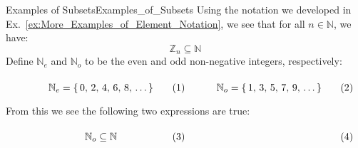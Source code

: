         \begin{lexample}{Examples of Subsets}{Examples_of_Subsets}
            Using the notation we developed in
            Ex.~\ref{ex:More_Examples_of_Element_Notation}, we see that
            for all $n\in\mathbb{N}$, we have:
            \begin{equation}
                \mathbb{Z}_{n}\subseteq\mathbb{N}
            \end{equation}
            Define $\mathbb{N}_{e}$ and $\mathbb{N}_{o}$ to be the even
            and odd non-negative integers, respectively:
            \par
            \begin{subequations}
                \begin{minipage}[b]{0.49\textwidth}
                    \begin{equation}
                        \label{eqn:Even_Pos_Ints_Ellipses}%
                        \mathbb{N}_{e}=\{\,0,\,2,\,4,\,6,\,8,\,\dots\,\}
                    \end{equation}
                \end{minipage}
                \hfill
                \begin{minipage}[b]{0.49\textwidth}
                    \begin{equation}
                        \label{eqn:Odd_Pos_Ints_Ellipses}%
                        \mathbb{N}_{o}=\{\,1,\,3,\,5,\,7,\,9,\,\dots\,\}
                    \end{equation}
                \end{minipage}
            \end{subequations}
            \par\vspace{2.5ex}
            From this we see the following two expressions are true:
            \par\hfill\par
            \begin{subequations}
                \begin{minipage}[b]{0.49\textwidth}
                    \begin{equation}
                        \mathbb{N}_{o}\subseteq\mathbb{N}
                    \end{equation}
                \end{minipage}
                \hfill
                \begin{minipage}[b]{0.49\textwidth}
                    \begin{equation}

\end{equation}
\end{minipage}
\end{subequations}
\end{lexample}
